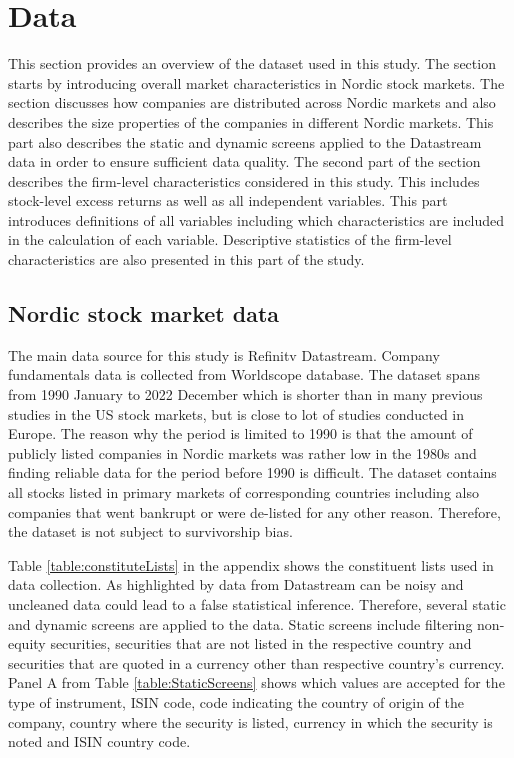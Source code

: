 \documentclass[12pt]{article}
\begin{document}
\section{Data}\label{Data}

This section provides an overview of the dataset used in this study. The section starts by introducing overall market characteristics in Nordic stock markets. The section discusses how companies are distributed across Nordic markets and also describes the size properties of the companies in different Nordic markets. This part also describes the static and dynamic screens applied to the Datastream data in order to ensure sufficient data quality. The second part of the section describes the firm-level characteristics considered in this study. This includes stock-level excess returns as well as all independent variables. This part introduces definitions of all variables including which characteristics are included in the calculation of each variable. Descriptive statistics of the firm-level characteristics are also presented in this part of the study. \par

\subsection{Nordic stock market data}\label{NordicStockMarketData}

The main data source for this study is Refinitv Datastream. Company fundamentals data is collected from Worldscope database. The dataset spans from 1990 January to 2022 December which is shorter than in many previous studies in the US stock markets, but is close to lot of studies conducted in Europe.\footnotemark {} The reason why the period is limited to 1990 is that the amount of publicly listed companies in Nordic markets was rather low in the 1980s and finding reliable data for the period before 1990 is difficult. The dataset contains all stocks listed in primary markets of corresponding countries including also companies that went bankrupt or were de-listed for any other reason. Therefore, the dataset is not subject to survivorship bias. \par

Table \ref{table:constituteLists} in the appendix shows the constituent lists used in data collection. As highlighted by \citet{Ince2006} data from Datastream can be noisy and uncleaned data could lead to a false statistical inference.\footnotemark {} Therefore, several static and dynamic screens are applied to the data. Static screens include filtering non-equity securities, securities that are not listed in the respective country and securities that are quoted in a currency other than respective country's currency. Panel A from Table \ref{table:StaticScreens} shows which values are accepted for the type of instrument, ISIN code, code indicating the country of origin of the company, country where the security is listed, currency in which the security is noted and ISIN country code. \par
\end{document}
